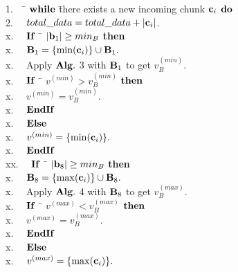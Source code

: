 \documentclass[lettersize,journal]{IEEEtran}
\begin{document}
\begin{tabbing}
1.~~ \= ${\bf while}$ \= there exists a new incoming chunk ${\bf c}_{i}$ ${\bf do}$ \\
2.~~ \>               \> $total\_data = total\_data + |{\bf c}_{i}|$. \\
x.~~ \>              \> ${\bf If}$ \,\=\,  $|{\bf b}_{1}| \geq min_B $  {\bf then}\\ 
x.~~ \>              \>           \> ${\bf B}_1 = \{\min({\bf c}_{i})\} \cup {\bf B}_1.$ \\
x.~~ \>              \>           \>  Apply ${\bf Alg.}$ 3 with ${\bf B}_1$ to get $v^{(min)}_B.$\\ 
x.~~ \>              \>           \> ${\bf If}$ \,\=\,  $v^{(min)} > v^{(min)}_B$\,\,${\bf then}$ \\
x.~~ \>              \>           \>   \> $v^{(min)} =v^{(min)}_B. $ \\
x.~~ \>              \>           \> ${\bf EndIf}$\\
x.~~ \>              \> ${\bf Else}$ \\
x.~~ \>              \>  \> $v^{(min)} = \{\min({\bf c}_{i})\}.$\\
x.~~ \>              \> ${\bf EndIf}$\\
xx.~~ \>              \> ${\bf If}$ \,\=\,  $|{\bf b}_{8}| \geq min_B $  {\bf then}\\ 
x.~~ \>              \>           \> ${\bf B}_8 = \{\max({\bf c}_{i})\} \cup {\bf B}_8.$ \\
x.~~ \>              \>           \>  Apply ${\bf Alg.}$ 4 with ${\bf B}_8$ to get $v^{(max)}_B.$\\ 
x.~~ \>              \>           \> ${\bf If}$ \,\=\,  $v^{(max)} < v^{(max)}_B$\,\,${\bf then}$ \\
x.~~ \>              \>           \>   \> $v^{(max)} =v^{(max)}_B. $ \\
x.~~ \>              \>           \> ${\bf EndIf}$\\
x.~~ \>              \> ${\bf Else}$ \\
x.~~ \>              \>  \> $v^{(max)} = \{\max({\bf c}_{i})\}.$\\

\end{tabbing}
\end{document}
